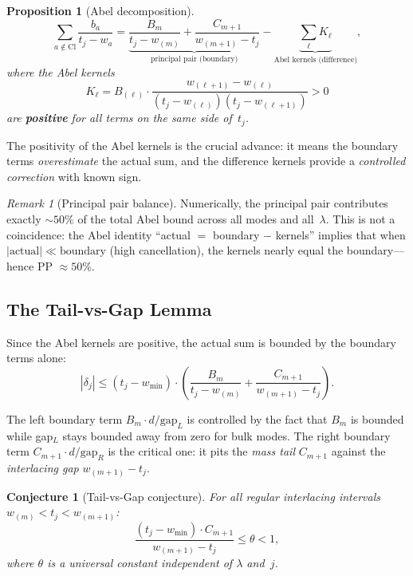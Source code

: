 \documentclass[12pt,a4paper]{article}
\newtheorem{proposition}[theorem]{Proposition}
\newtheorem{conjecture}[theorem]{Conjecture}
\theoremstyle{definition}
\theoremstyle{remark}
\newtheorem{remark}[theorem]{Remark}
\newcommand{\Cl}{\mathrm{Cl}}
\newcommand{\wmin}{w_{\min}}
\begin{document}
\begin{proposition}[Abel decomposition]
\label{prop:abel}
\begin{equation}
\label{eq:abel}
\sum_{a \notin \Cl} \frac{b_a}{t_j - w_a}
= \underbrace{\frac{B_m}{t_j - w_{(m)}} + \frac{C_{m+1}}{w_{(m+1)} - t_j}}_{\text{principal pair (boundary)}}
- \underbrace{\sum_{\ell} K_\ell}_{\text{Abel kernels (difference)}},
\end{equation}
where the Abel kernels
\begin{equation}
K_\ell = B_{(\ell)} \cdot \frac{w_{(\ell+1)} - w_{(\ell)}}{(t_j - w_{(\ell)})(t_j - w_{(\ell+1)})} > 0
\end{equation}
are \textbf{positive} for all terms on the same side of~$t_j$.
\end{proposition}

The positivity of the Abel kernels is the crucial advance:
it means the boundary terms \emph{overestimate} the actual sum,
and the difference kernels provide a \emph{controlled correction}
with known sign.

\begin{remark}[Principal pair balance]
Numerically, the principal pair contributes exactly $\sim 50\%$
of the total Abel bound across all modes and all~$\lambda$.
This is not a coincidence: the Abel identity
``actual $=$ boundary $-$ kernels'' implies that when $|\text{actual}|
\ll \text{boundary}$ (high cancellation), the kernels nearly equal
the boundary---hence PP $\approx 50\%$.
\end{remark}

\subsection{The Tail-vs-Gap Lemma}

Since the Abel kernels are positive, the actual sum is bounded by
the boundary terms alone:
\begin{equation}
|\delta_j| \leq (t_j - \wmin) \cdot
\left(\frac{B_m}{t_j - w_{(m)}} + \frac{C_{m+1}}{w_{(m+1)} - t_j}\right).
\end{equation}

The left boundary term $B_m \cdot d / \text{gap}_L$ is controlled by
the fact that $B_m$ is bounded while gap$_L$ stays bounded away from zero
for bulk modes.
The right boundary term $C_{m+1} \cdot d / \text{gap}_R$ is the
critical one: it pits the \emph{mass tail} $C_{m+1}$ against the
\emph{interlacing gap} $w_{(m+1)} - t_j$.

\begin{conjecture}[Tail-vs-Gap conjecture]
\label{conj:tvg}
For all regular interlacing intervals $w_{(m)} < t_j < w_{(m+1)}$:
\begin{equation}
\label{eq:tvg}
\frac{(t_j - \wmin) \cdot C_{m+1}}{w_{(m+1)} - t_j} \leq \theta < 1,
\end{equation}
where $\theta$ is a universal constant independent of $\lambda$ and~$j$.
\end{conjecture}
\end{document}
